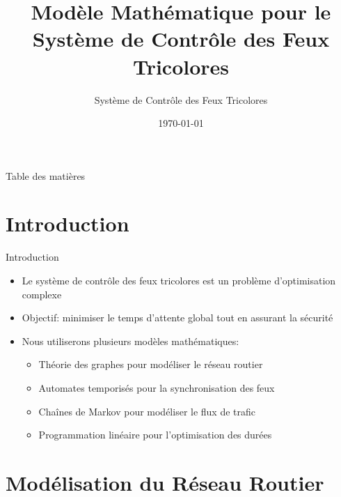 \documentclass{beamer}
\title{Modèle Mathématique pour le Système de Contrôle des Feux Tricolores}
\author{Système de Contrôle des Feux Tricolores}
\date{\today}
\begin{document}
\begin{frame}
\titlepage
\end{frame}

\begin{frame}{Table des matières}
\tableofcontents
\end{frame}

\section{Introduction}

\begin{frame}{Introduction}
\begin{itemize}
    \item Le système de contrôle des feux tricolores est un problème d'optimisation complexe
    \item Objectif: minimiser le temps d'attente global tout en assurant la sécurité
    \item Nous utiliserons plusieurs modèles mathématiques:
    \begin{itemize}
        \item Théorie des graphes pour modéliser le réseau routier
        \item Automates temporisés pour la synchronisation des feux
        \item Chaînes de Markov pour modéliser le flux de trafic
        \item Programmation linéaire pour l'optimisation des durées
    \end{itemize}
\end{itemize}
\end{frame}

\section{Modélisation du Réseau Routier}
\end{document}
